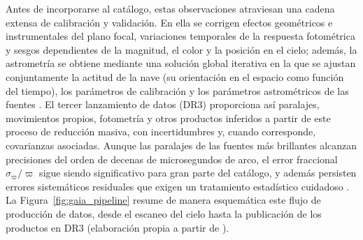 \documentclass[stu, 12pt, letterpaper, donotrepeattitle, floatsintext, natbib]{apa7_ula}
\begin{document}
Antes de incorporarse al catálogo, estas observaciones atraviesan una
cadena extensa de calibración y validación. En ella se corrigen
efectos geométricos e instrumentales del plano focal, variaciones
temporales de la respuesta fotométrica y sesgos dependientes de la
magnitud, el color y la posición en el cielo; además, la astrometría
se obtiene mediante una solución global iterativa en la que se
ajustan conjuntamente la actitud de la nave (su orientación en el
espacio como función del tiempo), los parámetros de
calibración y los parámetros astrométricos de las fuentes
\citep{Prusti_2016,Lindegren_2021,Vallenari2022GaiaDR}. El tercer
lanzamiento de datos (DR3) proporciona así paralajes, movimientos
propios, fotometría y otros productos inferidos a partir de este
proceso de reducción masiva, con incertidumbres y, cuando
corresponde, covarianzas asociadas. Aunque las paralajes de las
fuentes más brillantes alcanzan precisiones del orden de decenas de
microsegundos de arco, el error fraccional $\sigma_\varpi/\varpi$
sigue siendo significativo para gran parte del catálogo, y además
persisten errores sistemáticos residuales que exigen un tratamiento
estadístico cuidadoso \citep{luri2018gaia,Vallenari2022GaiaDR}. La
Figura~\ref{fig:gaia_pipeline} resume de manera esquemática este flujo
de producción de datos, desde el escaneo del cielo hasta la
publicación de los productos en DR3 (elaboración propia a partir de
\citealt{Prusti_2016,Vallenari2022GaiaDR}).
\end{document}
